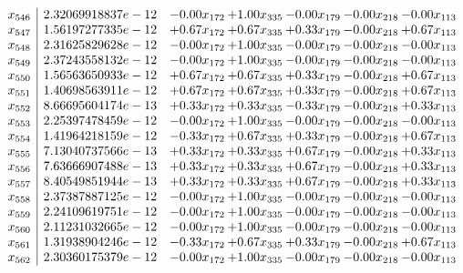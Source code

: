 \documentclass[8pt]{article}
\begin{document}
\[\begin{array}{c| c c@{\hskip 2pt} c@{\hskip 2pt} c@{\hskip 2pt} c@{\hskip 2pt} c@{\hskip 2pt} }
 x_{546}   &  2.32069918837e-12 & -0.00 x_{172} & +  1.00 x_{335} & -0.00 x_{179} & -0.00 x_{218} & -0.00 x_{113}\\
 x_{547}   &  1.56197277335e-12 & +  0.67 x_{172} & +  0.67 x_{335} & +  0.33 x_{179} & -0.00 x_{218} & +  0.67 x_{113}\\
 x_{548}   &  2.31625829628e-12 & -0.00 x_{172} & +  1.00 x_{335} & -0.00 x_{179} & -0.00 x_{218} & -0.00 x_{113}\\
 x_{549}   &  2.37243558132e-12 & -0.00 x_{172} & +  1.00 x_{335} & -0.00 x_{179} & -0.00 x_{218} & -0.00 x_{113}\\
 x_{550}   &  1.56563650933e-12 & +  0.67 x_{172} & +  0.67 x_{335} & +  0.33 x_{179} & -0.00 x_{218} & +  0.67 x_{113}\\
 x_{551}   &  1.40698563911e-12 & +  0.67 x_{172} & +  0.67 x_{335} & +  0.33 x_{179} & -0.00 x_{218} & +  0.67 x_{113}\\
 x_{552}   &  8.66695604174e-13 & +  0.33 x_{172} & +  0.33 x_{335} & -0.33 x_{179} & -0.00 x_{218} & +  0.33 x_{113}\\
 x_{553}   &  2.25397478459e-12 & -0.00 x_{172} & +  1.00 x_{335} & -0.00 x_{179} & -0.00 x_{218} & -0.00 x_{113}\\
 x_{554}   &  1.41964218159e-12 & -0.33 x_{172} & +  0.67 x_{335} & +  0.33 x_{179} & -0.00 x_{218} & +  0.67 x_{113}\\
 x_{555}   &  7.13040737566e-13 & +  0.33 x_{172} & +  0.33 x_{335} & +  0.67 x_{179} & -0.00 x_{218} & +  0.33 x_{113}\\
 x_{556}   &  7.63666907488e-13 & +  0.33 x_{172} & +  0.33 x_{335} & +  0.67 x_{179} & -0.00 x_{218} & +  0.33 x_{113}\\
 x_{557}   &  8.40549851944e-13 & +  0.33 x_{172} & +  0.33 x_{335} & +  0.67 x_{179} & -0.00 x_{218} & +  0.33 x_{113}\\
 x_{558}   &  2.37387887125e-12 & -0.00 x_{172} & +  1.00 x_{335} & -0.00 x_{179} & -0.00 x_{218} & -0.00 x_{113}\\
 x_{559}   &  2.24109619751e-12 & -0.00 x_{172} & +  1.00 x_{335} & -0.00 x_{179} & -0.00 x_{218} & -0.00 x_{113}\\
 x_{560}   &  2.11231032665e-12 & -0.00 x_{172} & +  1.00 x_{335} & -0.00 x_{179} & -0.00 x_{218} & -0.00 x_{113}\\
 x_{561}   &  1.31938904246e-12 & -0.33 x_{172} & +  0.67 x_{335} & +  0.33 x_{179} & -0.00 x_{218} & +  0.67 x_{113}\\
 x_{562}   &  2.30360175379e-12 & -0.00 x_{172} & +  1.00 x_{335} & -0.00 x_{179} & -0.00 x_{218} & -0.00 x_{113}\\

\end{array}\]
\end{document}
